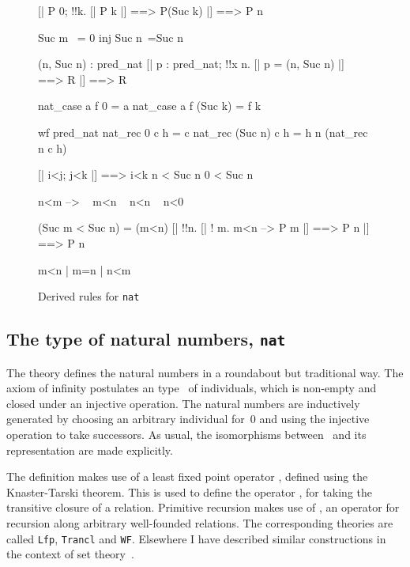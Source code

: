 \begin{figure} \underscoreon
\begin{ttbox}
     [| P 0; !!k. [| P k |] ==> P(Suc k) |]  ==> P n

   Suc m ~= 0
        inj Suc
    n~=Suc n

      (n, Suc n) : pred_nat
    [| p : pred_nat;  !!x n. [| p = (n, Suc n) |] ==> R |] ==> R

     nat_case a f 0 = a
   nat_case a f (Suc k) = f k

    wf pred_nat
      nat_rec 0 c h = c
    nat_rec (Suc n) c h = h n (nat_rec n c h)

     [| i<j;  j<k |] ==> i<k
          n < Suc n
  0 < Suc n

   n<m --> ~ m<n 
  ~ n<n
      ~ n<0

    (Suc m < Suc n) = (m<n)
    [| !!n. [| ! m. m<n --> P m |] ==> P n |]  ==>  P n

    m<n | m=n | n<m
\end{ttbox}
\caption{Derived rules for {\tt nat}} \label{hol-nat2}
\end{figure}


\subsection{The type of natural numbers, {\tt nat}}
The theory  defines the natural numbers in a roundabout but
traditional way.  The axiom of infinity postulates an type~ of
individuals, which is non-empty and closed under an injective operation.
The natural numbers are inductively generated by choosing an arbitrary
individual for~0 and using the injective operation to take successors.  As
usual, the isomorphisms between~ and its representation are made
explicitly.

The definition makes use of a least fixed point operator ,
defined using the Knaster-Tarski theorem.  This is used to define the
operator , for taking the transitive closure of a relation.
Primitive recursion makes use of , an operator for recursion
along arbitrary well-founded relations.  The corresponding theories are
called {\tt Lfp}, {\tt Trancl} and {\tt WF}\@.  Elsewhere I have described
similar constructions in the context of set theory~\cite{paulson-set-II}.

